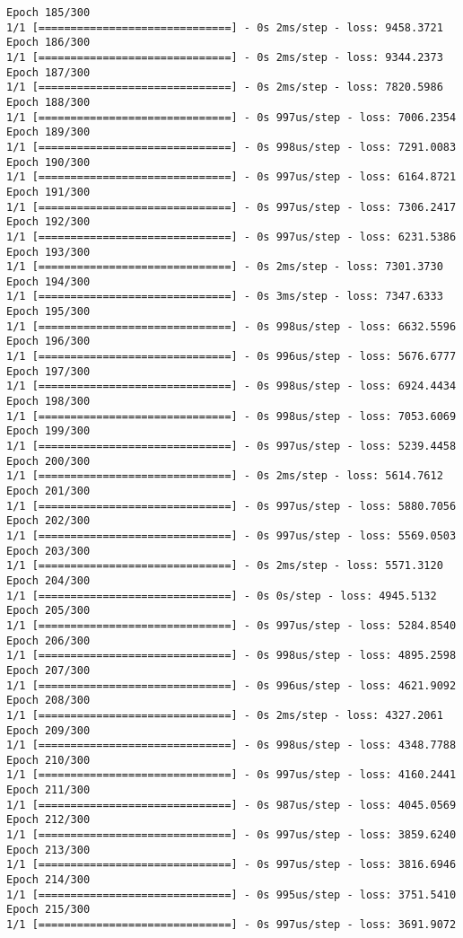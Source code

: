 \documentclass[11pt]{article}
\begin{document}
\begin{Verbatim}[commandchars=\\\{\}]
Epoch 185/300
1/1 [==============================] - 0s 2ms/step - loss: 9458.3721
Epoch 186/300
1/1 [==============================] - 0s 2ms/step - loss: 9344.2373
Epoch 187/300
1/1 [==============================] - 0s 2ms/step - loss: 7820.5986
Epoch 188/300
1/1 [==============================] - 0s 997us/step - loss: 7006.2354
Epoch 189/300
1/1 [==============================] - 0s 998us/step - loss: 7291.0083
Epoch 190/300
1/1 [==============================] - 0s 997us/step - loss: 6164.8721
Epoch 191/300
1/1 [==============================] - 0s 997us/step - loss: 7306.2417
Epoch 192/300
1/1 [==============================] - 0s 997us/step - loss: 6231.5386
Epoch 193/300
1/1 [==============================] - 0s 2ms/step - loss: 7301.3730
Epoch 194/300
1/1 [==============================] - 0s 3ms/step - loss: 7347.6333
Epoch 195/300
1/1 [==============================] - 0s 998us/step - loss: 6632.5596
Epoch 196/300
1/1 [==============================] - 0s 996us/step - loss: 5676.6777
Epoch 197/300
1/1 [==============================] - 0s 998us/step - loss: 6924.4434
Epoch 198/300
1/1 [==============================] - 0s 998us/step - loss: 7053.6069
Epoch 199/300
1/1 [==============================] - 0s 997us/step - loss: 5239.4458
Epoch 200/300
1/1 [==============================] - 0s 2ms/step - loss: 5614.7612
Epoch 201/300
1/1 [==============================] - 0s 997us/step - loss: 5880.7056
Epoch 202/300
1/1 [==============================] - 0s 997us/step - loss: 5569.0503
Epoch 203/300
1/1 [==============================] - 0s 2ms/step - loss: 5571.3120
Epoch 204/300
1/1 [==============================] - 0s 0s/step - loss: 4945.5132
Epoch 205/300
1/1 [==============================] - 0s 997us/step - loss: 5284.8540
Epoch 206/300
1/1 [==============================] - 0s 998us/step - loss: 4895.2598
Epoch 207/300
1/1 [==============================] - 0s 996us/step - loss: 4621.9092
Epoch 208/300
1/1 [==============================] - 0s 2ms/step - loss: 4327.2061
Epoch 209/300
1/1 [==============================] - 0s 998us/step - loss: 4348.7788
Epoch 210/300
1/1 [==============================] - 0s 997us/step - loss: 4160.2441
Epoch 211/300
1/1 [==============================] - 0s 987us/step - loss: 4045.0569
Epoch 212/300
1/1 [==============================] - 0s 997us/step - loss: 3859.6240
Epoch 213/300
1/1 [==============================] - 0s 997us/step - loss: 3816.6946
Epoch 214/300
1/1 [==============================] - 0s 995us/step - loss: 3751.5410
Epoch 215/300
1/1 [==============================] - 0s 997us/step - loss: 3691.9072

\end{Verbatim}
\end{document}

